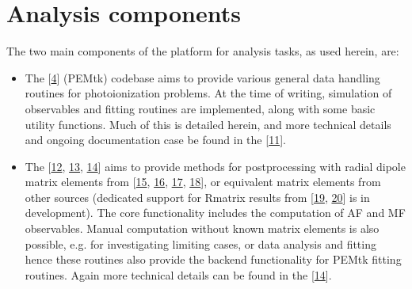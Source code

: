 \documentclass[letterpaper,table,10pt,english]{jupyterBook}
\begin{document}
\section{Analysis components}
\label{\detokenize{part1/platform_intro_071122:analysis-components}}\label{\detokenize{part1/platform_intro_071122:sect-platform-analysis}}
\sphinxAtStartPar
The two main components of the platform for analysis tasks, as used herein, are:
\begin{itemize}
\item {} 
\sphinxAtStartPar
The  {[}\hyperlink{cite.backmatter/bibliography:id574}{4}{]} (PEMtk) codebase aims to provide various general data handling routines for photoionization problems. At the time of writing, simulation of observables and fitting routines are implemented, along with some basic utility functions.
Much of this is detailed herein, and more technical details and ongoing documentation case be found in the  {[}\hyperlink{cite.backmatter/bibliography:id573}{11}{]}.

\item {} 
\sphinxAtStartPar
The  {[}\hyperlink{cite.backmatter/bibliography:id561}{12}, \hyperlink{cite.backmatter/bibliography:id508}{13}, \hyperlink{cite.backmatter/bibliography:id506}{14}{]} aims to provide methods for post\sphinxhyphen{}processing with  radial dipole matrix
elements from  {[}\hyperlink{cite.backmatter/bibliography:id640}{15}, \hyperlink{cite.backmatter/bibliography:id527}{16}, \hyperlink{cite.backmatter/bibliography:id671}{17}, \hyperlink{cite.backmatter/bibliography:id643}{18}{]}, or equivalent matrix elements from other sources (dedicated support for R\sphinxhyphen{}matrix results from  {[}\hyperlink{cite.backmatter/bibliography:id450}{19}, \hyperlink{cite.backmatter/bibliography:id715}{20}{]} is in development).
The core functionality includes the computation of AF and MF observables. Manual computation without known matrix elements is also possible, e.g. for investigating
limiting cases, or data analysis and fitting \sphinxhyphen{} hence these routines also provide the backend functionality for PEMtk fitting routines. Again more technical details can be found in the  {[}\hyperlink{cite.backmatter/bibliography:id506}{14}{]}.

\end{itemize}
\end{document}

